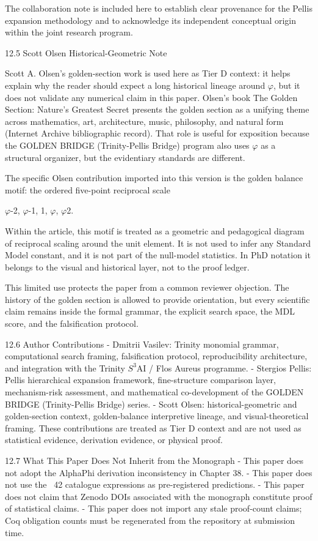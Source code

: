   The collaboration note is included here to establish clear provenance for the Pellis
  expansion methodology and to acknowledge its independent conceptual origin within
  the joint research program.

  12.5 Scott Olsen Historical-Geometric Note

  Scott A. Olsen's golden-section work is used here as Tier D context: it helps explain why
  the reader should expect a long historical lineage around $\varphi$, but it does not validate any
  numerical claim in this paper. Olsen's book \citep{olsen2006} The Golden Section: Nature's Greatest
  Secret presents the golden section as a unifying theme across mathematics, art,
  architecture, music, philosophy, and natural form (Internet Archive bibliographic
  record). That role is useful for exposition because the GOLDEN BRIDGE (Trinity-Pellis Bridge) program also uses $\varphi$
  as a structural organizer, but the evidentiary standards are different.

  The specific Olsen contribution imported into this version is the golden balance motif:
  the ordered five-point reciprocal scale

  $\varphi$-2, $\varphi$-1, 1, $\varphi$, $\varphi$2.

  Within the article, this motif is treated as a geometric and pedagogical diagram of
  reciprocal scaling around the unit element. It is not used to infer any Standard Model
  constant, and it is not part of the null-model statistics. In PhD notation it belongs to the
  visual and historical layer, not to the proof ledger.

  This limited use protects the paper from a common reviewer objection. The history of
  the golden section is allowed to provide orientation, but every scientific claim remains
  inside the formal grammar, the explicit search space, the MDL score, and the
  falsification protocol.

  12.6 Author Contributions
  - Dmitrii Vasilev: Trinity monomial grammar, computational search framing,
  falsification protocol, reproducibility architecture, and integration with the Trinity $S^{3}$AI
  / Flos Aureus programme.
  - Stergios Pellis: Pellis hierarchical expansion framework, fine-structure comparison
  layer, mechanism-risk assessment, and mathematical co-development of the
  GOLDEN BRIDGE (Trinity-Pellis Bridge) series.
  - Scott Olsen: historical-geometric and golden-section context, golden-balance
  interpretive lineage, and visual-theoretical framing. These contributions are treated as
  Tier D context and are not used as statistical evidence, derivation evidence, or physical
  proof.

  12.7 What This Paper Does Not Inherit from the Monograph
  - This paper does not adopt the AlphaPhi derivation inconsistency in Chapter 38.
  - This paper does not use the ~42 catalogue expressions as pre-registered predictions.
  - This paper does not claim that Zenodo DOIs associated with the monograph constitute
  proof of statistical claims.
  - This paper does not import any stale proof-count claims; Coq obligation counts must
  be regenerated from the repository at submission time.

